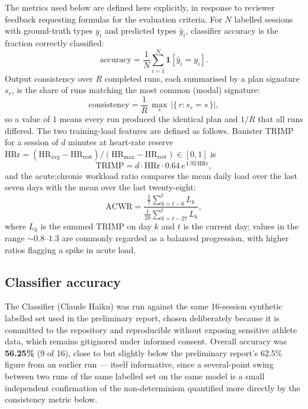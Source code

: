 The metrics used below are defined here explicitly, in response to reviewer feedback requesting formulas for the evaluation criteria. For $N$ labelled sessions with ground-truth types $y_i$ and predicted types $\hat{y}_i$, classifier accuracy is the fraction correctly classified:
\[
\mathrm{accuracy} = \frac{1}{N}\sum_{i=1}^{N}\mathbf{1}\!\left[\hat{y}_i = y_i\right].
\]
Output consistency over $R$ completed runs, each summarised by a plan signature $s_r$, is the share of runs matching the most common (modal) signature:
\[
\mathrm{consistency} = \frac{1}{R}\,\max_{s}\,\bigl|\{\, r : s_r = s \,\}\bigr|,
\]
so a value of $1$ means every run produced the identical plan and $1/R$ that all runs differed. The two training-load features are defined as follows. Banister TRIMP for a session of $d$ minutes at heart-rate reserve $\mathrm{HRr} = (\mathrm{HR}_{\mathrm{avg}} - \mathrm{HR}_{\mathrm{rest}}) / (\mathrm{HR}_{\mathrm{max}} - \mathrm{HR}_{\mathrm{rest}}) \in [0,1]$ is
\[
\mathrm{TRIMP} = d \cdot \mathrm{HRr} \cdot 0.64\, e^{\,1.92\,\mathrm{HRr}},
\]
and the acute:chronic workload ratio compares the mean daily load over the last seven days with the mean over the last twenty-eight:
\[
\mathrm{ACWR} = \frac{\tfrac{1}{7}\sum_{k=t-6}^{t} L_k}{\tfrac{1}{28}\sum_{k=t-27}^{t} L_k},
\]
where $L_k$ is the summed TRIMP on day $k$ and $t$ is the current day; values in the range ${\sim}0.8$--$1.3$ are commonly regarded as a balanced progression, with higher ratios flagging a spike in acute load.

\subsection{Classifier accuracy}

The Classifier (Claude Haiku) was run against the same 16-session synthetic labelled set used in the preliminary report, chosen deliberately because it is committed to the repository and reproducible without exposing sensitive athlete data, which remains gitignored under informed consent. Overall accuracy was \textbf{56.25\%} (9 of 16), close to but slightly below the preliminary report's 62.5\% figure from an earlier run --- itself informative, since a several-point swing between two runs of the same labelled set on the same model is a small independent confirmation of the non-determinism quantified more directly by the consistency metric below.


